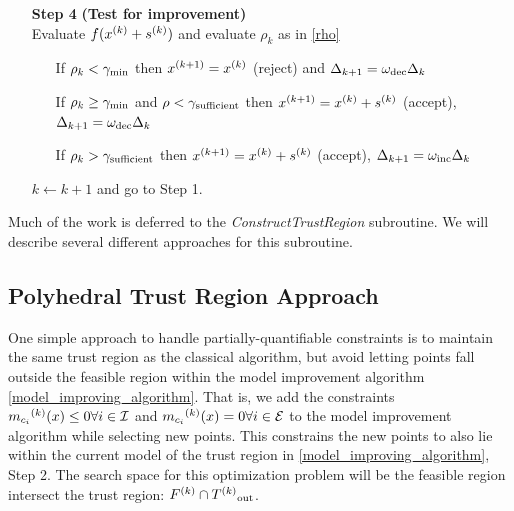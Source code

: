 \begin{algorithm}[H]
\begin{itemize}
        \item[\textbf{Step 4}] \textbf{(Test for improvement)} \\
            Evaluate $f({x}^{(k)} + {{s}^{(k)}})$ and evaluate $\rho_k$ as in \cref{rho} \begin{itemize}
                \item[] If $\rho_k < \gamma_{\text{min}}$ then ${x}^{(k+1)}={x}^{(k)}$ (reject) and $\Delta_{k+1} = \omega_{\text{dec}}\Delta_{k}$
                \item[] If $\rho_k \ge \gamma_{\text{min}}$ and $\rho < \gamma_{\text{sufficient}}$ then ${x}^{(k+1)}={x}^{(k)}+{{s}^{(k)}}$ (accept), $\Delta_{k+1} = \omega_{\text{dec}}\Delta_{k}$
                \item[] If $\rho_k > \gamma_{\text{sufficient}}$ then ${x}^{(k+1)}={x}^{(k)}+{{s}^{(k)}}$ (accept), $\Delta_{k+1} = \omega_{\text{inc}}\Delta_{k}$
            \end{itemize}
            $k \gets k+1$ and go to Step 1.
    \end{itemize}
\end{algorithm}

 

Much of the work is deferred to the \emph{ConstructTrustRegion} subroutine.
We will describe several different approaches for this subroutine.



\subsection{Polyhedral Trust Region Approach}
One simple approach to handle partially-quantifiable constraints is to maintain the same trust region as the classical algorithm, but avoid letting points fall outside the feasible region within the model improvement algorithm \cref{model_improving_algorithm}.
That is, we add the constraints ${{m}_{c_i}}^{(k)}(x) \le 0 \forall i \in \mathcal{I}$ and ${{m}_{c_i}}^{(k)}(x) = 0 \forall i \in \mathcal{E}$ to the model improvement algorithm while selecting new points.
This constrains the new points to also lie within the current model of the trust region in \cref{model_improving_algorithm}, Step 2.
The search space for this optimization problem will be the feasible region intersect the trust region: ${F}^{(k)} \cap {T^{(k)}}_{\text{out}} $.

